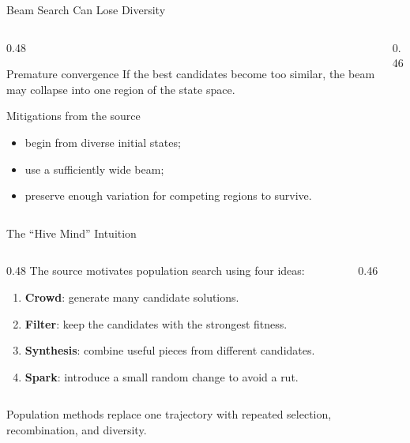 \documentclass[aspectratio=169,10pt]{beamer}
\begin{document}
\begin{frame}[shrink=20]{Beam Search Can Lose Diversity}
  \begin{columns}[T,onlytextwidth]
    \begin{column}{0.48\textwidth}
      \begin{block}{Premature convergence}
        If the best candidates become too similar, the beam may collapse into one region of the state space.
      \end{block}

      \begin{block}{Mitigations from the source}
        \begin{itemize}
          \item begin from diverse initial states;
          \item use a sufficiently wide beam;
          \item preserve enough variation for competing regions to survive.
        \end{itemize}
      \end{block}
    \end{column}

    \begin{column}{0.46\textwidth}
    \end{column}
  \end{columns}
\end{frame}

\begin{frame}[shrink=20]{The ``Hive Mind'' Intuition}
  \begin{columns}[T,onlytextwidth]
    \begin{column}{0.48\textwidth}
      The source motivates population search using four ideas:

      \begin{enumerate}
        \item \textbf{Crowd}: generate many candidate solutions.
        \item \textbf{Filter}: keep the candidates with the strongest fitness.
        \item \textbf{Synthesis}: combine useful pieces from different candidates.
        \item \textbf{Spark}: introduce a small random change to avoid a rut.
      \end{enumerate}
    \end{column}

    \begin{column}{0.46\textwidth}
    \end{column}
  \end{columns}

  \begin{keyidea}
    Population methods replace one trajectory with repeated selection, recombination, and diversity.
  \end{keyidea}
\end{frame}
\end{document}
